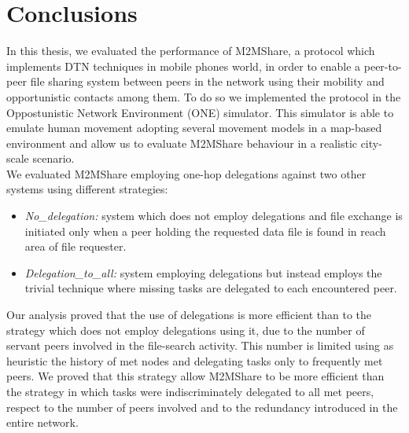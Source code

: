 
\chapter{Conclusions}\label{conclusioni} %





In this thesis, we evaluated the performance of M2MShare, a protocol which implements DTN techniques in mobile phones world, in order to enable a peer-to-peer file sharing system between peers in the network using their mobility and opportunistic contacts among them. To do so we implemented the protocol in the Oppostunistic Network Environment (ONE) simulator. This simulator is able to emulate human movement adopting several movement models in a map-based environment and allow us to evaluate M2MShare behaviour in a realistic city-scale scenario.
\\

We evaluated M2MShare employing one-hop delegations against two other systems using different strategies:
\begin{itemize}
\item \textit{No\_delegation:} system which does not employ delegations and file exchange is initiated only when a peer holding the requested data file is found in reach area of file requester.
\item \textit{Delegation\_to\_all:} system employing delegations but instead employs the trivial technique where missing tasks are delegated to each encountered peer.
\end{itemize}
Our analysis proved that the use of delegations is more efficient than to the strategy which does not employ delegations using it, due to the number of servant peers involved in the file-search activity. This number is limited using as heuristic the history of met nodes and delegating tasks only to frequently met peers. We proved that this strategy allow M2MShare to be more efficient than the strategy in which tasks were indiscriminately delegated to all met peers, respect to the number of peers involved and to the redundancy introduced in the entire network.
\\

